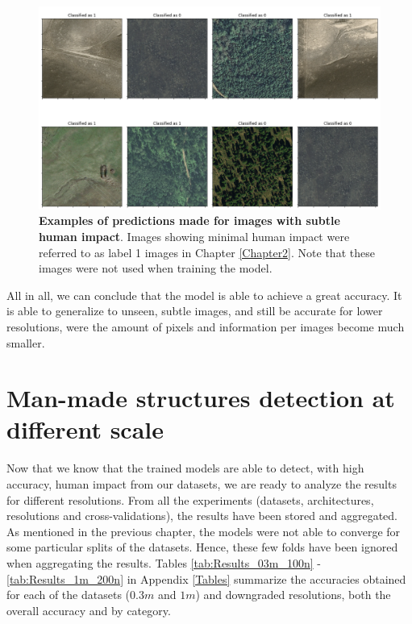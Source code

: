 \begin{figure}[H]
	\centering
	\captionsetup{width=1\linewidth}
	\includegraphics[width=1\textwidth]{Figures/results/class_dataset03m_res03_l1.png}
	\caption{\textbf{Examples of predictions made for images with subtle human impact}. Images showing minimal human impact were referred to as label 1 images in Chapter \ref{Chapter2}. Note that these images were not used when training the model.}
	\label{fig:dataset03m_res03_l1}
\end{figure}

All in all, we can conclude that the model is able to achieve a great accuracy. It is able to generalize to unseen, subtle images, and still be accurate for lower resolutions, were the amount of pixels and information per images become much smaller. 

\section{Man-made structures detection at different scale}

Now that we know that the trained models are able to detect, with high accuracy, human impact from our datasets, we are ready to analyze the results for different resolutions. From all the experiments (datasets, architectures, resolutions and cross-validations), the results have been stored and aggregated. As mentioned in the previous chapter, the models were not able to converge for some particular splits of the datasets. Hence, these few folds have been ignored when aggregating the results. Tables \ref{tab:Results_03m_100n} - \ref{tab:Results_1m_200n} in Appendix \ref{Tables} summarize the accuracies obtained for each of the datasets ($0.3m$ and $1m$) and downgraded resolutions, both the overall accuracy and by category. 

